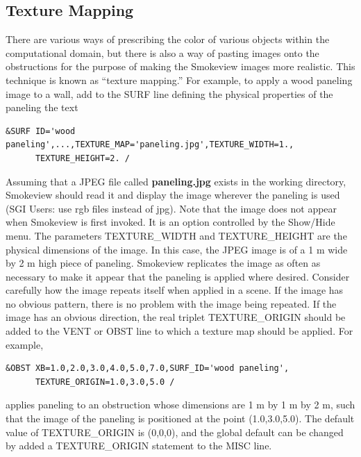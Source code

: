 \documentclass[11pt]{book}
\begin{document}
\subsection{Texture Mapping}%

There are various ways of prescribing the color of various objects
within the computational domain, but there is also a way of pasting
images onto the obstructions for the purpose of making the Smokeview
images more realistic. This technique is known as ``texture mapping.''
For example, to apply a wood paneling image to a wall,
add to the {\ct SURF} line defining the physical properties of the
paneling the text

\footnotesize
\begin{verbatim}
&SURF ID='wood paneling',...,TEXTURE_MAP='paneling.jpg',TEXTURE_WIDTH=1.,
      TEXTURE_HEIGHT=2. /
\end{verbatim}
\normalsize
Assuming that a JPEG file called {\bf paneling.jpg} exists in the
working directory, Smokeview should read it and display the image
wherever the paneling is used (SGI Users: use rgb files instead of jpg).
Note that the image does not appear when Smokeview is first invoked. It is an option controlled by
the {\ct Show/Hide} menu. The parameters {\ct TEXTURE\_WIDTH}
and {\ct TEXTURE\_HEIGHT} are the physical dimensions of the image.
In this case, the JPEG image is of a 1 m wide by 2 m high piece of
paneling. Smokeview replicates the image as often as necessary to
make it appear that the paneling is applied where desired.
Consider carefully how the image repeats itself when
applied in a scene. If the image has no obvious pattern, there is no
problem with the image being repeated. If the image has an obvious
direction, the real triplet {\ct TEXTURE\_ORIGIN} should be added to
the {\ct VENT} or {\ct OBST} line to which a texture map
should be applied. For example,

\footnotesize
\begin{verbatim}
&OBST XB=1.0,2.0,3.0,4.0,5.0,7.0,SURF_ID='wood paneling',
      TEXTURE_ORIGIN=1.0,3.0,5.0 /
\end{verbatim}
\normalsize
applies paneling to an obstruction whose dimensions are 1 m by
1 m by 2 m, such that the image of the paneling is positioned
at the point (1.0,3.0,5.0). The default value of {\ct TEXTURE\_ORIGIN}
is (0,0,0), and the global default can be changed by added a
{\ct TEXTURE\_ORIGIN} statement to the {\ct MISC} line.




\clearpage
\end{document}
